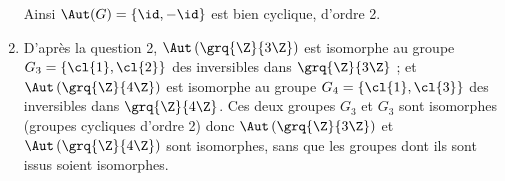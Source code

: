 \begin{enumerate}
 Ainsi $\Aut(G) = \{\id, -\id \}$ est bien cyclique, d'ordre 2.

 \item D'après la question 2, $\Aut\left(\grq{\Z}{3\Z} \right)$ est isomorphe au groupe $G_3 = \{\cl{1},\cl{2}\}$ des inversibles dans $\grq{\Z}{3\Z}$ ; et $\Aut\left(\grq{\Z}{4\Z} \right)$ est isomorphe au groupe $G_4 = \{\cl{1},\cl{3}\}$ des inversibles dans $\grq{\Z}{4\Z}$. Ces deux groupes $G_3$ et $G_3$ sont isomorphes (groupes cycliques d'ordre 2) donc $\Aut\left(\grq{\Z}{3\Z} \right)$ et $\Aut\left(\grq{\Z}{4\Z} \right)$ sont isomorphes, sans que les groupes dont ils sont issus soient isomorphes.
\end{enumerate}



